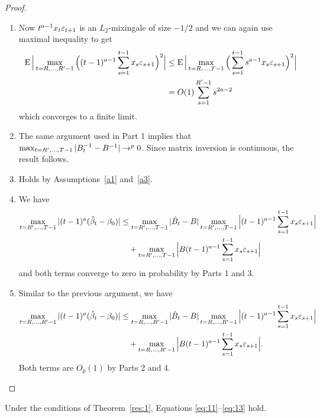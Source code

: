 \documentclass[12pt,fleqn]{article}
\providecommand\phantomsection{}
\begin{document}
\begin{proof}
\begin{enumerate}
  \item Now $t^{a-1} x_t \varepsilon_{t+1}$ is an $L_2$-mixingale of size
    $-1/2$ and we can again use  maximal inequality to get
    \begin{align*}
      \operatorname{E} \Big\lvert \max_{t=R,\dots,R'-1} \Big((t-1)^{a - 1} \sum_{s=1}^{t-1} x_s \varepsilon_{s+1} \Big)^2 \Big\rvert
      &\leq \operatorname{E} \Big\lvert \max_{t=R,\dots,T-1} \Big(\sum_{s=1}^{t-1} s^{a-1} x_s \varepsilon_{s+1} \Big)^2 \Big\rvert \\
      &= O(1) \sum_{s=1}^{R'-1} s^{2a - 2}
    \end{align*}
    which converges to a finite limit.
  \item The same argument used in Part 1 implies that $\max_{t=R',\dots,T-1} |
    B_t^{-1} - B^{-1}| \to^p 0$. Since matrix inversion is continuous,
    the result follows.
  \item Holds by Assumptions~\ref{a1} and~\ref{a3}.
  \item We have
    \begin{align*}
      \omaxb{t} | (t-1)^a (\hat{\beta}_t - \btrue) |
      &\leq \omaxb{t} |\hat{B}_t - B|
      \omaxb{t} \Big|(t-1)^{a-1} \sum_{s=1}^{t-1} x_s \ep_{s+1} \Big| \\
      &\quad + \omaxb{t} \Big| B (t-1)^{a-1} \sum_{s=1}^{t-1} x_s \ep_{s+1} \Big|
    \end{align*}
    and both terms converge to zero in probability by Parts 1 and 3.
  \item Similar to the previous argument, we have
    \begin{align*}
      \omaxc{t} | (t-1)^a (\hat{\beta}_t - \btrue) |
      & \leq \omaxc{t} | \hat{B}_t - B | \omaxc{t} \Big|(t-1)^{a-1} \sum_{s=1}^{t-1} x_s \ep_{s+1} \Big| \\
      &\quad + \omaxc{t} \Big| B (t-1)^{a-1} \sum_{s=1}^{t-1} x_s \ep_{s+1} \Big|.
    \end{align*}
    Both terms are $O_p(1)$ by Parts 2 and 4. \qedhere
  \end{enumerate}
\end{proof}

\phantomsection
{}
\begin{alem}\label{res:a4}
  Under the conditions of Theorem~\ref{res:1}, Equations
  \eqref{eq:11}--\eqref{eq:13} hold.
\end{alem}
\end{document}

